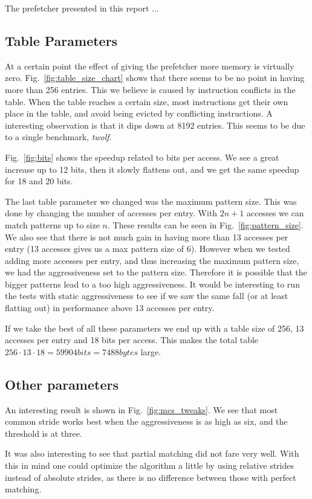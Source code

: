 The prefetcher presented in this report ...

\subsection{Table Parameters}
At a certain point the effect of giving the prefetcher more memory is virtually
zero. Fig.~\ref{fig:table_size_chart} shows that there seems to be no point in
having more than 256 entries. This we believe is caused by instruction
conflicts in the table. When the table reaches a certain size, most
instructions get their own place in the table, and avoid being evicted by
conflicting instructions.
A interesting observation is that it dips down at 8192 entries. This seems
to be due to a single benchmark, \emph{twolf}.

Fig.~\ref{fig:bits} shows the speedup related to bits per access.
We see a great increase up to 12 bits, then it slowly flattens out,
and we get the same speedup for 18 and 20 bits.

The last table parameter we changed was the maximum pattern size.
This was done by changing the number of accesses per entry.
With $2n+1$ accesses we can match patterns up to size $n$.
These results can be seen in Fig.~\ref{fig:pattern_size}.
We also see that there is not much gain in having more than 13
accesses per entry (13 accesses gives us a max pattern size of 6).
However when we tested adding more accesses per entry, and thus
increasing the maximum pattern size, we had the aggressiveness
set to the pattern size. Therefore it is possible that the bigger
patterns lead to a too high aggressiveness. It would be interesting
to run the tests with static aggressiveness to see if we saw the
same fall (or at least flatting out) in performance above 13 accesses
per entry.

If we take the best of all these parameters we end up with a table size
of 256, 13 accesses per entry and 18 bits per access. This makes
the total table $256 \cdot 13 \cdot 18 = 59904 bits = 7488 bytes$ large.

\subsection{Other parameters}
An interesting result is shown in Fig.~\ref{fig:mcs_tweaks}.
We see that most common stride works best when the aggressiveness
is as high as six, and the threshold is at three.

It was also interesting to see that partial matching did not fare very well.
With this in mind one could optimize the algorithm a little by using relative
strides instead of absolute strides, as there is no difference between those
with perfect matching.

